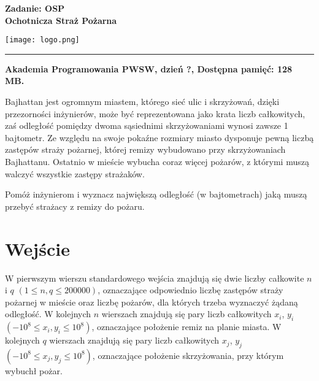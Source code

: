 \documentclass[10pt]{article}
\begin{document}
    

    \noindent
    \begin{minipage}{0.5\textwidth}
        \LARGE{\textsf{\textbf{Zadanie: OSP\\Ochotnicza Straż Pożarna}}}
    \end{minipage}
    \begin{minipage}{0.5\textwidth}
        \begin{flushright}
            \texttt{[image: logo.png]}
        \end{flushright}
    \end{minipage}
    
    \noindent\rule{\textwidth}{0.4pt}
    
    \noindent\textbf{Akademia Programowania PWSW, dzień ?, Dostępna pamięć: 128 MB.}
    \vspace{1em}
    
    
    \noindent
    Bajhattan jest ogromnym miastem, którego sieć ulic i skrzyżowań, dzięki przezorności inżynierów, może być reprezentowana jako krata liczb całkowitych, zaś odległość pomiędzy dwoma sąsiednimi skrzyżowaniami wynosi zawsze 1 bajtometr. Ze względu na swoje pokaźne rozmiary miasto dysponuje pewną liczbą zastępów straży pożarnej, której remizy wybudowano przy skrzyżowaniach Bajhattanu. Ostatnio w mieście wybucha coraz więcej pożarów, z którymi muszą walczyć wszystkie zastępy strażaków.
    
    Pomóż inżynierom i wyznacz największą odległość (w bajtometrach) jaką muszą przebyć strażacy z remizy do pożaru. 


    \section*{Wejście}
    
    W pierwszym wierszu standardowego wejścia znajdują się dwie liczby całkowite $n$ i $q$ $(1\leq n, q\leq 200000)$, oznaczające odpowiednio liczbę zastępów straży pożarnej w mieście oraz liczbę pożarów, dla których trzeba wyznaczyć żądaną odległość. W kolejnych $n$ wierszach znajdują się pary liczb całkowitych $x_{i}$, $y_{i}$ $(-10^{8} \leq x_{i}, y_{i} \leq 10^{8})$, oznaczające położenie remiz na planie miasta. W kolejnych $q$ wierszach znajdują się pary liczb całkowitych $x_{j}$, $y_{j}$ $(-10^{8} \leq x_{j}, y_{j} \leq 10^{8})$, oznaczające położenie skrzyżowania, przy którym wybuchł pożar.
\end{document}
